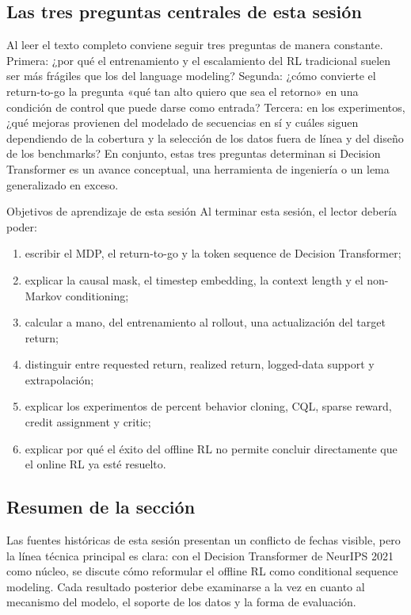 \subsection{Las tres preguntas centrales de esta sesión}

Al leer el texto completo conviene seguir tres preguntas de manera constante. Primera: ¿por qué el entrenamiento y el escalamiento del RL tradicional suelen ser más frágiles que los del language modeling? Segunda: ¿cómo convierte el return-to-go la pregunta «qué tan alto quiero que sea el retorno» en una condición de control que puede darse como entrada? Tercera: en los experimentos, ¿qué mejoras provienen del modelado de secuencias en sí y cuáles siguen dependiendo de la cobertura y la selección de los datos fuera de línea y del diseño de los benchmarks? En conjunto, estas tres preguntas determinan si Decision Transformer es un avance conceptual, una herramienta de ingeniería o un lema generalizado en exceso.

\begin{importantbox}{Objetivos de aprendizaje de esta sesión}
Al terminar esta sesión, el lector debería poder:
\begin{enumerate}
  \item escribir el MDP, el return-to-go y la token sequence de Decision Transformer;
  \item explicar la causal mask, el timestep embedding, la context length y el non-Markov conditioning;
  \item calcular a mano, del entrenamiento al rollout, una actualización del target return;
  \item distinguir entre requested return, realized return, logged-data support y extrapolación;
  \item explicar los experimentos de percent behavior cloning, CQL, sparse reward, credit assignment y critic;
  \item explicar por qué el éxito del offline RL no permite concluir directamente que el online RL ya esté resuelto.
\end{enumerate}
\end{importantbox}

\subsection{Resumen de la sección}

Las fuentes históricas de esta sesión presentan un conflicto de fechas visible, pero la línea técnica principal es clara: con el Decision Transformer de NeurIPS 2021 como núcleo, se discute cómo reformular el offline RL como conditional sequence modeling. Cada resultado posterior debe examinarse a la vez en cuanto al mecanismo del modelo, el soporte de los datos y la forma de evaluación.

